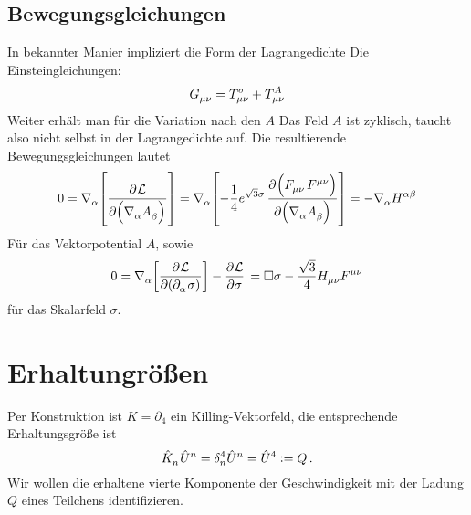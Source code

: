 \subsection{Bewegungsgleichungen}
In bekannter Manier impliziert die Form der Lagrangedichte 
Die Einsteingleichungen:
\begin{equation}
\tensor{G}{_\mu_\nu}=\tensor*{T}{*^{\sigma}_\mu_\nu}+\tensor*{T}{*^{A}*_\mu*_\nu}
\end{equation}
Weiter erhält man für die Variation nach den $A$ 
Das Feld $A$ ist zyklisch, taucht also nicht selbst in der Lagrangedichte auf.
Die resultierende Bewegungsgleichungen lautet
\begin{equation}
0=\tensor{\nabla}{_\alpha}
\left[\dpd{\mathcal{L}}{\left(\tensor{\nabla}{_\alpha}\tensor{A}{_\beta}\right)}\right]
=\tensor{\nabla}{_\alpha}\left[-\frac{1}{4}e^{\sqrt{3}\sigma}\dpd{\left(\tensor{F}{_\mu_\nu}\tensor{F}{^\mu^\nu}\right)}{\left(\tensor{\nabla}{_\alpha}\tensor{A}{_\beta}\right)}\right]
=-\tensor{\nabla}{_\alpha}\tensor{H}{^\alpha^\beta}
 \end{equation}
 Für das Vektorpotential $A$, sowie
 \begin{equation}
0=\tensor{\nabla}{_\alpha}\left[\dpd{\mathcal{L}}{\left(\tensor{\partial}{_\alpha}\sigma\right)}\right]
-\dpd{\mathcal{L}}{\sigma}\\
=\square \sigma
-\frac{\sqrt{3}}{4}\tensor*{H}{_\mu_\nu}\tensor*{F}{^\mu^\nu}
\label{eq:dymdilat}
 \end{equation}
 für das Skalarfeld $\sigma$. 
\section{Erhaltungrößen}
Per Konstruktion ist $K=\partial_4$ ein Killing-Vektorfeld, die entsprechende
Erhaltungsgröße ist 
\begin{equation}
\tensor{\hat{K}}{_n}\tensor{\hat{U}}{^n}=\tensor*{\delta}{^4_n}\tensor{\hat{U}}{^n}
=\tensor{\hat{U}}{^4}:=Q\,.
\end{equation}
Wir wollen die erhaltene vierte Komponente der Geschwindigkeit mit 
der Ladung $Q$ eines Teilchens identifizieren.
